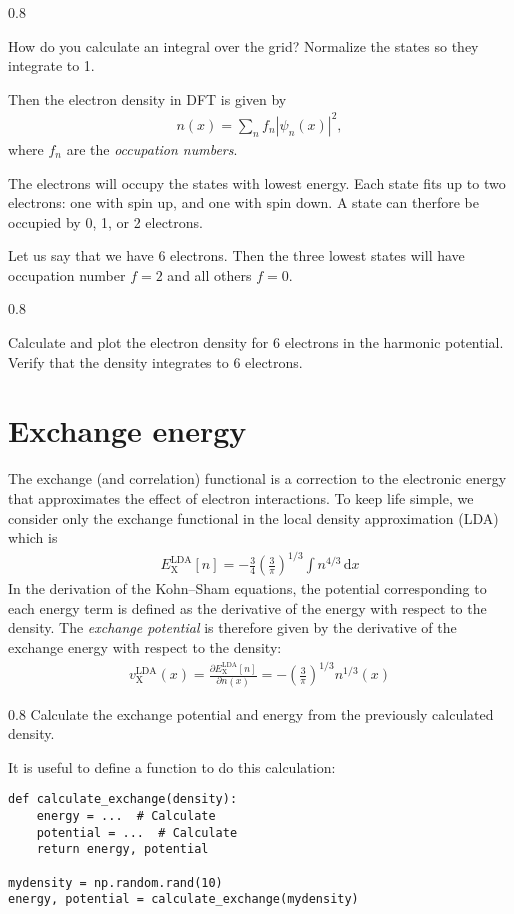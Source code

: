 \documentclass{article}
\newcommand{\exercise}[1]{
  \bigskip
  \begin{boxedminipage}[c]{0.8\linewidth}
  #1
  \end{boxedminipage}
  \bigskip
}
\newcommand{\dee}[0]{\mathrm d}
\newcommand{\idee}[0]{\,\dee}
\newcommand{\pdiff}[2]{\frac{\partial #1}{\partial #2}}
\newcommand{\X}[0]{\mathrm{X}}
\newcommand{\LDA}[0]{\mathrm{LDA}}
\begin{document}
\exercise{
How do you calculate an integral over the grid?
Normalize the states so they integrate to 1.
}

Then the electron density in DFT is given by
\begin{align}
  n(x) = \sum_n f_n |\psi_n(x)|^2,
\end{align}
where $f_n$ are the \emph{occupation numbers}.

The electrons will
occupy the states with lowest energy.  Each
state fits up to two electrons: one with spin up, and one with spin down.
A state can therfore be occupied by 0, 1, or 2 electrons.

Let us say that we have 6 electrons.  Then the three lowest states
will have occupation number $f=2$ and all others $f=0$.

\exercise{
Calculate and plot the electron density for 6 electrons in the harmonic potential.
Verify that the density integrates to 6 electrons.
}

\section{Exchange energy}
The exchange (and correlation) functional is a correction to the
electronic energy that approximates the effect of electron interactions.
To keep life simple, we consider only the exchange functional in the local density approximation (LDA) which is
\begin{align}
  E_\X^\LDA[n] = -\frac 34 \left(\frac 3 \pi\right)^{1/3} \int n^{4/3} \idee x
\end{align}
In the derivation of the Kohn--Sham equations, the potential
corresponding to each energy term is defined
as the derivative of the energy with respect to the density.
The \emph{exchange potential} is therefore given by the derivative
of the exchange energy with respect to the density:
\begin{align}
  v_{\X}^\LDA(x) = \pdiff{E_\X^\LDA[n]}{n(x)} = -\left(\frac3 \pi\right)^{1/3}
  n^{1/3}(x)
\end{align}

\exercise{Calculate the exchange potential and energy from the previously
calculated density.}

It is useful to define a function to do this calculation:
\begin{lstlisting}
def calculate_exchange(density):
    energy = ...  # Calculate
    potential = ...  # Calculate
    return energy, potential

mydensity = np.random.rand(10)
energy, potential = calculate_exchange(mydensity)
\end{lstlisting}
\end{document}
